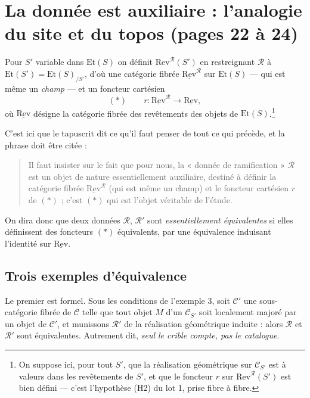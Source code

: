 \documentclass[11pt,a4paper]{article}
\begin{document}
\section*{La donnée est auxiliaire : l'analogie du site et du topos (pages 22 à 24)}

Pour $S'$ variable dans $\mathrm{Et}(S)$ on définit
$\mathrm{Rev}^{\mathcal{R}}(S')$ en restreignant $\mathcal{R}$ à
$\mathrm{Et}(S') = \mathrm{Et}(S)_{/S'}$, d'où une catégorie fibrée
$\underline{\mathrm{Rev}}^{\mathcal{R}}$ sur $\mathrm{Et}(S)$ --- qui est même
un \emph{champ} --- et un foncteur cartésien
\[
  (\ast) \qquad
  r : \underline{\mathrm{Rev}}^{\mathcal{R}} \longrightarrow
  \underline{\mathrm{Rev}} ,
\]
où $\underline{\mathrm{Rev}}$ désigne la catégorie fibrée des revêtements des
objets de $\mathrm{Et}(S)$.\footnote{On suppose ici, pour tout $S'$, que la
réalisation géométrique sur $\mathcal{C}_{S'}$ est à valeurs dans les
revêtements de $S'$, et que le foncteur $r$ sur
$\mathrm{Rev}^{\mathcal{R}}(S')$ est bien défini --- c'est l'hypothèse (H2) du
lot 1, prise fibre à fibre.}

C'est ici que le tapuscrit dit ce qu'il faut penser de tout ce qui précède, et
la phrase doit être citée :

\begin{quote}
Il faut insister sur le fait que pour nous, la « donnée de ramification »
$\mathcal{R}$ est un objet de nature essentiellement auxiliaire, destiné à
définir la catégorie fibrée $\underline{\mathrm{Rev}}^{\mathcal{R}}$ (qui est
même un champ) et le foncteur cartésien $r$ de $(\ast)$ ; c'est $(\ast)$ qui
est l'objet véritable de l'étude.
\end{quote}

On dira donc que deux données $\mathcal{R}$, $\mathcal{R}'$ sont
\emph{essentiellement équivalentes} si elles définissent des foncteurs $(\ast)$
équivalents, par une équivalence induisant l'identité sur
$\underline{\mathrm{Rev}}$.

\subsection*{Trois exemples d'équivalence}

Le premier est formel. Sous les conditions de l'exemple 3, soit $\mathcal{C}'$
une sous-catégorie fibrée de $\mathcal{C}$ telle que tout objet $M$ d'un
$\mathcal{C}_{S'}$ soit localement majoré par un objet de $\mathcal{C}'$, et
munissons $\mathcal{R}'$ de la réalisation géométrique induite : alors
$\mathcal{R}$ et $\mathcal{R}'$ sont équivalentes. Autrement dit,
\emph{seul le crible compte, pas le catalogue}.
\end{document}
